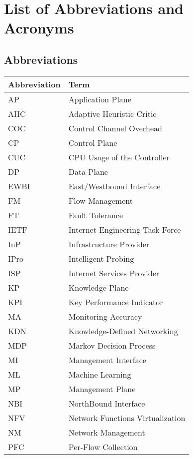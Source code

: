 \chapter*{List of Abbreviations and Acronyms}

\section*{Abbreviations}
\begin{longtable}[l]{>{}l<{}l}
  \textbf{Abbreviation} & \textbf{Term} \\[0.5ex] \hline%
  \endfirsthead%
\renewcommand{\arraystretch}{1.4}\label{simbolosg}%
AP      &   Application Plane\\
AHC     &   Adaptive Heuristic Critic\\
COC     &   Control Channel Overhead\\
CP      &   Control Plane\\
CUC     &   CPU Usage of the Controller\\
DP      &   Data Plane\\
EWBI    &   East/Westbound Interface\\
FM      &   Flow Management\\
FT      &   Fault Tolerance\\
IETF    &   Internet Engineering Task Force\\
InP     &   Infrastructure Provider\\
IPro    &   Intelligent Probing\\
ISP     &   Internet Services Provider\\
KP      &   Knowledge Plane\\
KPI     &   Key Performance Indicator\\
MA      &   Monitoring Accuracy\\
KDN     &   Knowledge-Defined Networking\\
MDP     &   Markov Decision Process\\
MI      &   Management Interface\\
ML      &   Machine Learning\\
MP      &   Management Plane\\
NBI     &   NorthBound Interface\\
NFV     &   Network Functions Virtualization\\
NM      &   Network Management\\
PFC     &   Per-Flow Collection\\

\end{longtable}
